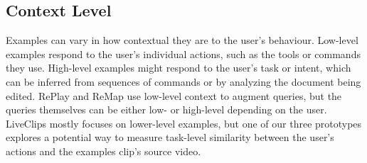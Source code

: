 \subsection{Context Level}
Examples can vary in how contextual they are to the user's behaviour. Low-level examples respond to the user's individual actions, such as the tools or commands they use. High-level examples might respond to the user's task or intent, which can be inferred from sequences of commands or by analyzing the document being edited. RePlay and ReMap use low-level context to augment queries, but the queries themselves can be either low- or high-level depending on the user. LiveClips mostly focuses on lower-level examples, but one of our three prototypes explores a potential way to measure task-level similarity between the user's actions and the examples clip's source video.